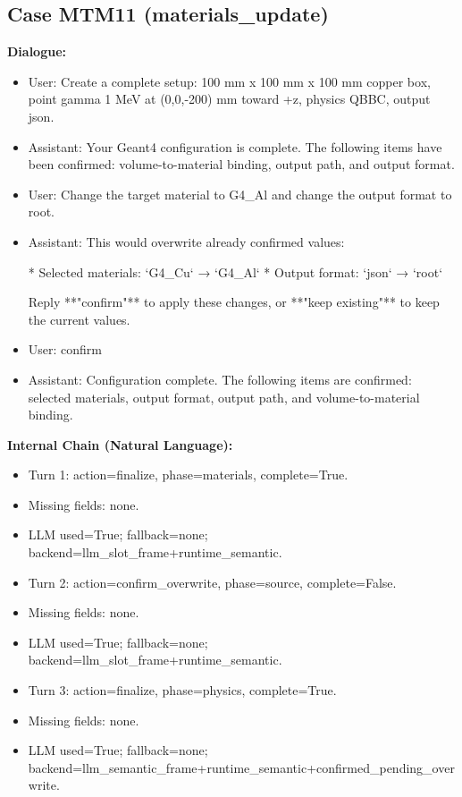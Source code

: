 \documentclass[11pt]{ctexart}
\begin{document}
\subsection{Case MTM11 (materials\_update)}
\textbf{Dialogue:}
\begin{itemize}
\item User: Create a complete setup: 100 mm x 100 mm x 100 mm copper box, point gamma 1 MeV at (0,0,-200) mm toward +z, physics QBBC, output json.
\item Assistant: Your Geant4 configuration is complete. The following items have been confirmed: volume-to-material binding, output path, and output format.
\item User: Change the target material to G4\_Al and change the output format to root.
\item Assistant: This would overwrite already confirmed values:

*   Selected materials: `G4\_Cu` → `G4\_Al`
*   Output format: `json` → `root`

Reply **"confirm"** to apply these changes, or **"keep existing"** to keep the current values.
\item User: confirm
\item Assistant: Configuration complete. The following items are confirmed: selected materials, output format, output path, and volume-to-material binding.
\end{itemize}
\textbf{Internal Chain (Natural Language):}
\begin{itemize}
\item Turn 1: action=finalize, phase=materials, complete=True.
\item Missing fields: none.
\item LLM used=True; fallback=none; backend=llm\_slot\_frame+runtime\_semantic.
\item Turn 2: action=confirm\_overwrite, phase=source, complete=False.
\item Missing fields: none.
\item LLM used=True; fallback=none; backend=llm\_slot\_frame+runtime\_semantic.
\item Turn 3: action=finalize, phase=physics, complete=True.
\item Missing fields: none.
\item LLM used=True; fallback=none; backend=llm\_semantic\_frame+runtime\_semantic+confirmed\_pending\_overwrite.
\end{itemize}
\end{document}
